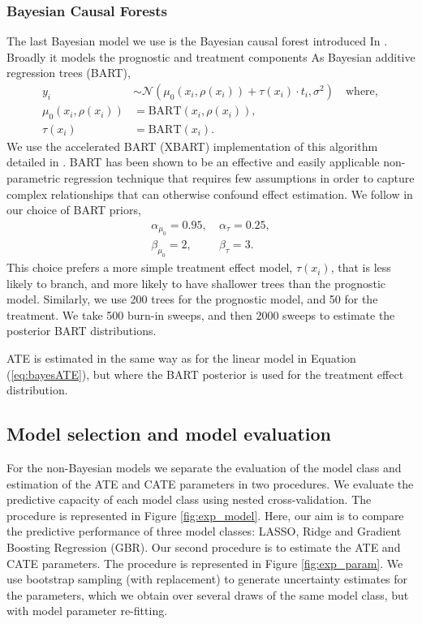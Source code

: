 \documentclass[12pt, a4paper]{article}
\begin{document}
\subsubsection*{Bayesian Causal Forests}
The last Bayesian model we use is the Bayesian causal forest introduced In
\citet{hahn2020}. Broadly it models the prognostic and treatment components As
Bayesian additive regression trees (BART),
\begin{align*}
y_i &\sim \mathcal{N}\!\left(
  \mu_0(x_i, \rho(x_i)) + \tau(x_i)\cdot t_i, 
  \sigma^2\right) 
  \quad\textrm{where}, \\
\mu_0(x_i, \rho(x_i)) &= \textrm{BART}(x_i, \rho(x_i)), \\
\tau(x_i) &= \textrm{BART}(x_i).
\end{align*}
We use the accelerated BART (XBART) implementation of this algorithm detailed 
in \citet{krantsevich2022}. BART \citep{chipman2010} has been shown to be an 
effective and easily applicable non-parametric regression technique that 
requires few assumptions in order to capture complex relationships that can 
otherwise confound effect estimation. We follow \cite{hahn2020} in our choice
of BART priors,
\begin{align*}
  \alpha_{\mu_0} = 0.95,&~
  \alpha_{\tau} = 0.25, \\
  \beta_{\mu_0} = 2,&~
  \beta_{\tau} = 3.
\end{align*}
This choice prefers a more simple treatment effect model, $\tau(x_i)$, that is
less likely to branch, and more likely to have shallower trees 
than the prognostic model. Similarly, we use 200 trees for the prognostic model,
and 50 for the treatment. We take 500 burn-in sweeps, and then 2000 sweeps
to estimate the posterior BART distributions.

ATE is estimated in the same way as for the linear model in Equation 
(\ref{eq:bayesATE}), but where the BART posterior is used for the 
treatment effect distribution.


\subsection{Model selection and model evaluation}

For the non-Bayesian models we separate the evaluation of the model class and
estimation of the ATE and CATE parameters in two procedures. We evaluate the
predictive capacity of each model class using nested cross-validation. The
procedure is represented in Figure \ref{fig:exp_model}. Here, our aim is to
compare the predictive performance of three model classes: LASSO, Ridge and
Gradient Boosting Regression (GBR). Our second procedure is to estimate the ATE
and CATE parameters. The procedure is represented in Figure
\ref{fig:exp_param}. We use bootstrap sampling (with replacement) to generate
uncertainty estimates for the parameters, which we obtain over several draws of
the same model class, but with model parameter re-fitting.
\end{document}
